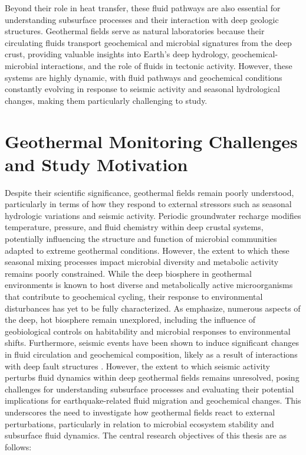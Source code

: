 Beyond their role in heat transfer, these fluid pathways are also essential for understanding subsurface processes and their interaction with deep geologic structures.
Geothermal fields serve as natural laboratories because their circulating fluids transport geochemical and microbial signatures from the deep crust, providing valuable insights into Earth's deep hydrology, geochemical-microbial interactions, and the role of fluids in tectonic activity.
However, these systems are highly dynamic, with fluid pathways and geochemical conditions constantly evolving in response to seismic activity and seasonal hydrological changes, making them particularly challenging to study.

\section{Geothermal Monitoring Challenges and Study Motivation}
Despite their scientific significance, geothermal fields remain poorly understood, particularly in terms of how they respond to external stressors such as seasonal hydrologic variations and seismic activity.
Periodic groundwater recharge modifies temperature, pressure, and fluid chemistry within deep crustal systems, potentially influencing the structure and function of microbial communities adapted to extreme geothermal conditions.
However, the extent to which these seasonal mixing processes impact microbial diversity and metabolic activity remains poorly constrained.
While the deep biosphere in geothermal environments is known to host diverse and metabolically active microorganisms that contribute to geochemical cycling, their response to environmental disturbances has yet to be fully characterized.
As \citet{colman2017review} emphasize, numerous aspects of the deep, hot biosphere remain unexplored, including the influence of geobiological controls on habitability and microbial responses to environmental shifts.
Furthermore, seismic events have been shown to induce significant changes in fluid circulation and geochemical composition, likely as a result of interactions with deep fault structures \citep{toutain1999seismo, ide2020kumamoto, igarashi1995radon, sano2016kumamoto}.
However, the extent to which seismic activity perturbs fluid dynamics within deep geothermal fields remains unresolved, posing challenges for understanding subsurface processes and evaluating their potential implications for earthquake-related fluid migration and geochemical changes.
This underscores the need to investigate how geothermal fields react to external perturbations, particularly in relation to microbial ecosystem stability and subsurface fluid dynamics.
The central research objectives of this thesis are as follows:

